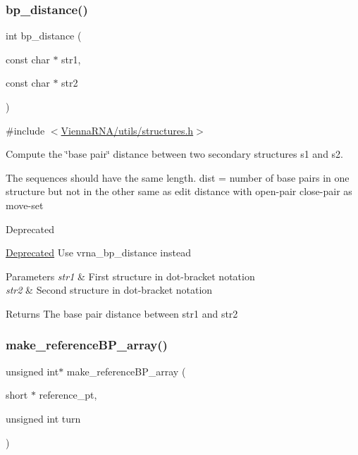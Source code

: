\subsubsection{\texorpdfstring{bp\+\_\+distance()}{bp\_distance()}}
{\footnotesize\ttfamily int bp\+\_\+distance (\begin{DoxyParamCaption}\item[{const char $\ast$}]{str1,  }\item[{const char $\ast$}]{str2 }\end{DoxyParamCaption})}



{\ttfamily \#include $<$\hyperlink{utils_2structures_8h}{Vienna\+R\+N\+A/utils/structures.\+h}$>$}



Compute the \char`\"{}base pair\char`\"{} distance between two secondary structures s1 and s2. 

The sequences should have the same length. dist = number of base pairs in one structure but not in the other same as edit distance with open-\/pair close-\/pair as move-\/set

\begin{DoxyRefDesc}{Deprecated}
\item[\hyperlink{deprecated__deprecated000189}{Deprecated}]Use vrna\+\_\+bp\+\_\+distance instead\end{DoxyRefDesc}

\begin{DoxyParams}{Parameters}
{\em str1} & First structure in dot-\/bracket notation \\
\hline
{\em str2} & Second structure in dot-\/bracket notation \\
\hline
\end{DoxyParams}
\begin{DoxyReturn}{Returns}
The base pair distance between str1 and str2 
\end{DoxyReturn}
\mbox{\label{group__struct__utils__deprecated_ga578cd9712dee812fb1c58aa3cc489864}} 
\subsubsection{\texorpdfstring{make\+\_\+reference\+B\+P\+\_\+array()}{make\_referenceBP\_array()}}
{\footnotesize\ttfamily unsigned int$\ast$ make\+\_\+reference\+B\+P\+\_\+array (\begin{DoxyParamCaption}\item[{short $\ast$}]{reference\+\_\+pt,  }\item[{unsigned int}]{turn }\end{DoxyParamCaption})}



